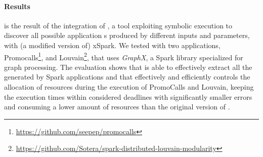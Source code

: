 \paragraph{Results}
\tool is the result of the integration of \dSymb, a tool exploiting symbolic execution to discover all possible application {\plan}s produced by different inputs and parameters, with (a modified version of) xSpark.
We tested \tool with two applications, Promocalls\footnote{\url{https://github.com/seepep/promocalls}}, and Louvain\footnote{\url{https://github.com/Sotera/spark-distributed-louvain-modularity}}, that uses \textit{GraphX}, a Spark library specialized for graph processing.
The evaluation shows that \approach is able to effectively extract all the \plans generated by Spark applications and that \tool effectively and efficiently controls the allocation of resources during the execution of PromoCalls and Louvain, keeping the execution times within considered deadlines with significantly smaller errors and consuming a lower amount of resources than the original version of \cSpark.
